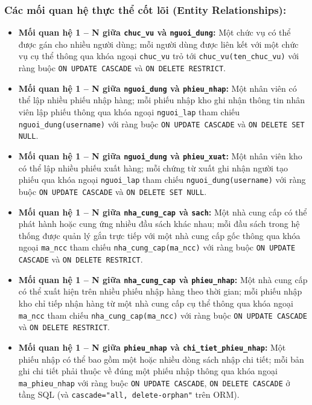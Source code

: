 \documentclass[12pt,a4paper]{article}
\begin{document}
\subsubsection*{Các mối quan hệ thực thể cốt lõi (Entity Relationships):}
\begin{itemize}
    \item \textbf{Mối quan hệ 1 -- N giữa \texttt{chuc\_vu} và \texttt{nguoi\_dung}:} Một chức vụ có thể được gán cho nhiều người dùng; mỗi người dùng được liên kết với một chức vụ cụ thể thông qua khóa ngoại \texttt{chuc\_vu} trỏ tới \texttt{chuc\_vu(ten\_chuc\_vu)} với ràng buộc \texttt{ON UPDATE CASCADE} và \texttt{ON DELETE RESTRICT}.
    \item \textbf{Mối quan hệ 1 -- N giữa \texttt{nguoi\_dung} và \texttt{phieu\_nhap}:} Một nhân viên có thể lập nhiều phiếu nhập hàng; mỗi phiếu nhập kho ghi nhận thông tin nhân viên lập phiếu thông qua khóa ngoại \texttt{nguoi\_lap} tham chiếu \texttt{nguoi\_dung(username)} với ràng buộc \texttt{ON UPDATE CASCADE} và \texttt{ON DELETE SET NULL}.
    \item \textbf{Mối quan hệ 1 -- N giữa \texttt{nguoi\_dung} và \texttt{phieu\_xuat}:} Một nhân viên kho có thể lập nhiều phiếu xuất hàng; mỗi chứng từ xuất ghi nhận người tạo phiếu qua khóa ngoại \texttt{nguoi\_lap} tham chiếu \texttt{nguoi\_dung(username)} với ràng buộc \texttt{ON UPDATE CASCADE} và \texttt{ON DELETE SET NULL}.
    \item \textbf{Mối quan hệ 1 -- N giữa \texttt{nha\_cung\_cap} và \texttt{sach}:} Một nhà cung cấp có thể phát hành hoặc cung ứng nhiều đầu sách khác nhau; mỗi đầu sách trong hệ thống được quản lý gắn trực tiếp với một nhà cung cấp gốc thông qua khóa ngoại \texttt{ma\_ncc} tham chiếu \texttt{nha\_cung\_cap(ma\_ncc)} với ràng buộc \texttt{ON UPDATE CASCADE} và \texttt{ON DELETE RESTRICT}.
    \item \textbf{Mối quan hệ 1 -- N giữa \texttt{nha\_cung\_cap} và \texttt{phieu\_nhap}:} Một nhà cung cấp có thể xuất hiện trên nhiều phiếu nhập hàng theo thời gian; mỗi phiếu nhập kho chỉ tiếp nhận hàng từ một nhà cung cấp cụ thể thông qua khóa ngoại \texttt{ma\_ncc} tham chiếu \texttt{nha\_cung\_cap(ma\_ncc)} với ràng buộc \texttt{ON UPDATE CASCADE} và \texttt{ON DELETE RESTRICT}.
    \item \textbf{Mối quan hệ 1 -- N giữa \texttt{phieu\_nhap} và \texttt{chi\_tiet\_phieu\_nhap}:} Một phiếu nhập có thể bao gồm một hoặc nhiều dòng sách nhập chi tiết; mỗi bản ghi chi tiết phải thuộc về đúng một phiếu nhập thông qua khóa ngoại \texttt{ma\_phieu\_nhap} với ràng buộc \texttt{ON UPDATE CASCADE}, \texttt{ON DELETE CASCADE} ở tầng SQL (và \texttt{cascade="all, delete-orphan"} trên ORM).

\end{itemize}
\end{document}
